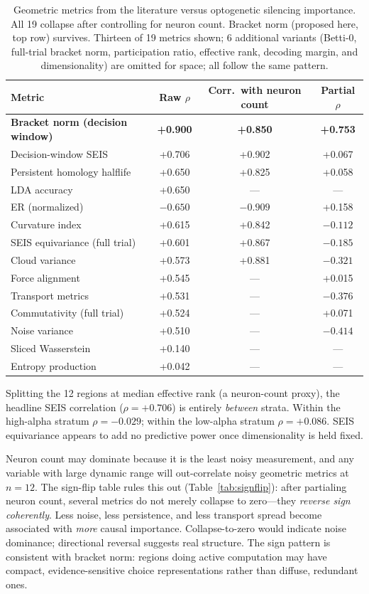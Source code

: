 \documentclass{article}
\begin{document}
\begin{table}[t]
\centering
\caption{Geometric metrics from the literature versus optogenetic silencing importance. All 19 collapse after controlling for neuron count. Bracket norm (proposed here, top row) survives. Thirteen of 19 metrics shown; 6 additional variants (Betti-0, full-trial bracket norm, participation ratio, effective rank, decoding margin, and dimensionality) are omitted for space; all follow the same pattern.}
\label{tab:confound}
\begin{tabular}{lccc}
\toprule
Metric & Raw $\rho$ & Corr.\ with neuron count & Partial $\rho$ \\
\midrule
\textbf{Bracket norm (decision window)} & \textbf{+0.900} & \textbf{+0.850} & \textbf{+0.753} \\
Decision-window SEIS & +0.706 & +0.902 & +0.067 \\
Persistent homology halflife & +0.650 & +0.825 & +0.058 \\
LDA accuracy & +0.650 & --- & --- \\
ER (normalized) & $-0.650$ & $-0.909$ & +0.158 \\
Curvature index & +0.615 & +0.842 & $-0.112$ \\
SEIS equivariance (full trial) & +0.601 & +0.867 & $-0.185$ \\
Cloud variance & +0.573 & +0.881 & $-0.321$ \\
Force alignment & +0.545 & --- & +0.015 \\
Transport metrics & +0.531 & --- & $-0.376$ \\
Commutativity (full trial) & +0.524 & --- & +0.071 \\
Noise variance & +0.510 & --- & $-0.414$ \\
Sliced Wasserstein & +0.140 & --- & --- \\
Entropy production & +0.042 & --- & --- \\
\bottomrule
\end{tabular}
\end{table}

Splitting the 12 regions at median effective rank (a neuron-count proxy), the headline SEIS correlation ($\rho = +0.706$) is entirely \emph{between} strata. Within the high-alpha stratum $\rho = -0.029$; within the low-alpha stratum $\rho = +0.086$. SEIS equivariance appears to add no predictive power once dimensionality is held fixed.

Neuron count may dominate because it is the least noisy measurement, and any variable with large dynamic range will out-correlate noisy geometric metrics at $n = 12$. The sign-flip table rules this out (Table~\ref{tab:signflip}): after partialing neuron count, several metrics do not merely collapse to zero---they \emph{reverse sign coherently}. Less noise, less persistence, and less transport spread become associated with \emph{more} causal importance. Collapse-to-zero would indicate noise dominance; directional reversal suggests real structure. The sign pattern is consistent with bracket norm: regions doing active computation may have compact, evidence-sensitive choice representations rather than diffuse, redundant ones.
\end{document}
